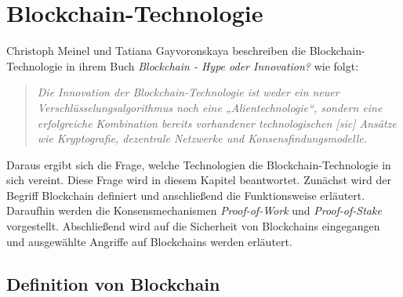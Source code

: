 \section{Blockchain-Technologie}
\label{sec:blockchain_basics}


Christoph Meinel und Tatiana Gayvoronskaya beschreiben die Blockchain-Technologie in ihrem Buch \textit{Blockchain - Hype oder Innovation?} wie folgt:

\begin{quote}
    \textit{Die Innovation der Blockchain-Technologie ist weder ein neuer Verschlüsselungsalgorithmus noch eine „Alientechnologie“, sondern eine erfolgreiche Kombination bereits vorhandener technologischen [sic] Ansätze wie Kryptografie, dezentrale Netzwerke und Konsensfindungsmodelle.} \\ \parencite[S. 17]{Meinel_BlockchainHypeInnovation}
\end{quote}

\noindent Daraus ergibt sich die Frage, welche Technologien die Blockchain-Technologie in sich vereint. Diese Frage wird in diesem Kapitel beantwortet. Zunächst wird der Begriff Blockchain definiert und anschließend die Funktionsweise erläutert. Daraufhin werden die Konsensmechanismen \textit{Proof-of-Work} und \textit{Proof-of-Stake} vorgestellt. Abschließend wird auf die Sicherheit von Blockchains eingegangen und ausgewählte Angriffe auf Blockchains werden erläutert.


\subsection{Definition von Blockchain}
\label{subsec:blockchain_definition}


